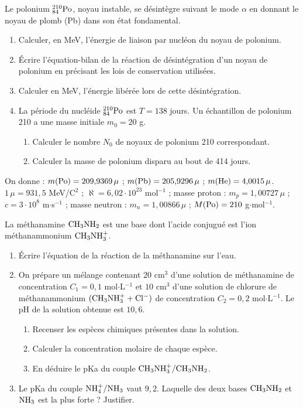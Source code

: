 \documentclass[11pt]{article}
\begin{document}


Le polonium $\mathrm{^{210}_{84}Po}$, noyau instable, se désintègre suivant le mode $\alpha$ en donnant le noyau de plomb (Pb) dans son état fondamental.

\begin{enumerate}
  \item Calculer, en MeV, l'énergie de liaison par nucléon du noyau de polonium.
  \item Écrire l'équation-bilan de la réaction de désintégration d'un noyau de polonium en précisant les lois de conservation utilisées.
  \item Calculer en MeV, l'énergie libérée lors de cette désintégration.
  \item La période du nucléide $\mathrm{^{210}_{84}Po}$ est $T = 138$ jours. Un échantillon de polonium 210 a une masse initiale $m_0 = 20$ g.
  \begin{enumerate}[label=\alph*.]
    \item Calculer le nombre $N_0$ de noyaux de polonium 210 correspondant.
    \item Calculer la masse de polonium disparu au bout de 414 jours.
  \end{enumerate}
\end{enumerate}
\noindent On donne : $m(\mathrm{Po}) = 209{,}9369\,\mu$ ; $m(\mathrm{Pb}) = 205{,}9296\,\mu$ ; $m(\mathrm{He}) = 4{,}0015\,\mu$. $1\,\mu = 931{,}5$ MeV/C$^2$ ; $\aleph = 6{,}02\cdot10^{23}$ mol$^{-1}$ ; masse proton : $m_p = 1{,}00727\,\mu$ ; $c = 3\cdot10^8$ m$\cdot$s$^{-1}$ ; masse neutron : $m_n = 1{,}00866\,\mu$ ; $M(\mathrm{Po}) = 210$ g$\cdot$mol$^{-1}$.

La méthanamine $\mathrm{CH_3NH_2}$ est une base dont l'acide conjugué est l'ion méthanammonium $\mathrm{CH_3NH_3^+}$.

\begin{enumerate}
  \item Écrire l'équation de la réaction de la méthanamine sur l'eau.
  \item On prépare un mélange contenant $20$ cm$^3$ d'une solution de méthanamine de concentration $C_1 = 0{,}1$ mol$\cdot$L$^{-1}$ et $10$ cm$^3$ d'une solution de chlorure de méthanammonium $(\mathrm{CH_3NH_3^+} + \mathrm{Cl^-})$ de concentration $C_2 = 0{,}2$ mol$\cdot$L$^{-1}$. Le pH de la solution obtenue est $10{,}6$.
  \begin{enumerate}[label=\alph*.]
    \item Recenser les espèces chimiques présentes dans la solution.
    \item Calculer la concentration molaire de chaque espèce.
    \item En déduire le pKa du couple $\mathrm{CH_3NH_3^+/CH_3NH_2}$.
  \end{enumerate}
  \item Le pKa du couple $\mathrm{NH_4^+/NH_3}$ vaut $9{,}2$. Laquelle des deux bases $\mathrm{CH_3NH_2}$ et $\mathrm{NH_3}$ est la plus forte ? Justifier.
\end{enumerate}
\end{document}
